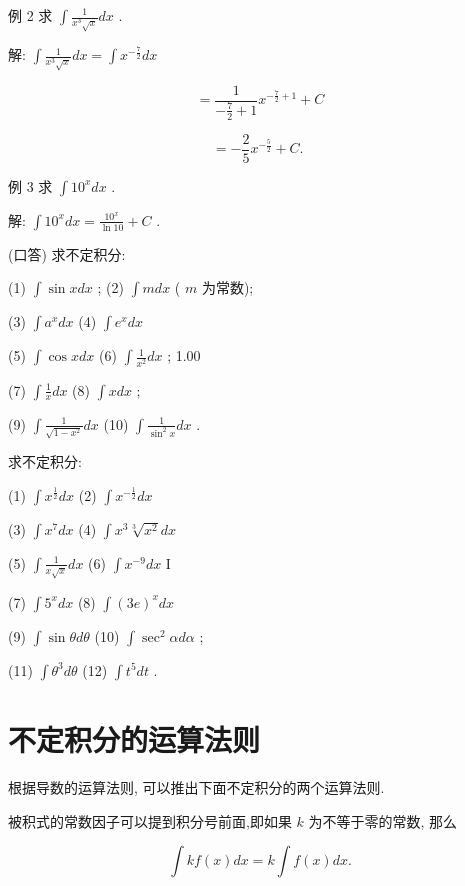\documentclass[lang=cn,newtx,12pt,scheme=chinese]{elegantbook}
\begin{document}
例 2 求 \(\int \frac{1}{{x}^{3}\sqrt{x}}{dx}\) .

解: \(\int \frac{1}{{x}^{3}\sqrt{x}}{dx} = \int {x}^{-\frac{7}{2}}{dx}\)

\[
= \frac{1}{-\frac{7}{2} + 1}{x}^{-\frac{7}{2} + 1} + C
\]

\[
= - \frac{2}{5}{x}^{-\frac{5}{2}} + C\text{. }
\]

例 3 求 \(\int {10}^{x}{dx}\) .

解: \(\int {10}^{x}{dx} = \frac{{10}^{x}}{\ln {10}} + C\) .

\begin{problemset}[练习]

\item (口答) 求不定积分:

(1) \(\int \sin {xdx}\) ; (2) \(\int {mdx}\) ( \(m\) 为常数);

(3) \(\int {a}^{x}{dx}\) (4) \(\int {e}^{x}{dx}\)

(5) \(\int \cos {xdx}\) (6) \(\int \frac{1}{{x}^{2}}{dx}\) ; 1.00

(7) \(\int \frac{1}{x}{dx}\) (8) \(\int {xdx}\) ;

(9) \(\int \frac{1}{\sqrt{1 - {x}^{2}}}{dx}\) (10) \(\int \frac{1}{{\sin }^{2}x}{dx}\) .

\item 求不定积分:

(1) \(\int {x}^{\frac{1}{2}}{dx}\) (2) \(\int {x}^{-\frac{1}{2}}{dx}\)

(3) \(\int {x}^{7}{dx}\) (4) \(\int {x}^{3}\sqrt[3]{{x}^{2}}{dx}\)

(5) \(\int \frac{1}{x\sqrt{x}}{dx}\) (6) \(\int {x}^{-9}{dx}\) I

(7) \(\int {5}^{x}{dx}\) (8) \(\int {\left( 3e\right) }^{x}{dx}\)

(9) \(\int \sin {\theta d\theta }\) (10) \(\int {\sec }^{2}{\alpha d\alpha }\) ;

(11) \(\int {\theta }^{3}{d\theta }\) (12) \(\int {t}^{5}{dt}\) .

\end{problemset}

\section{不定积分的运算法则}

根据导数的运算法则, 可以推出下面不定积分的两个运算法则.
\begin{proposition}[不定积分法则1]

被积式的常数因子可以提到积分号前面,即如果 \(k\) 为不等于零的常数, 那么

\[
\int {kf}\left( x\right) {dx} = k\int f\left( x\right) {dx}.
\]

\end{proposition}
\end{document}
